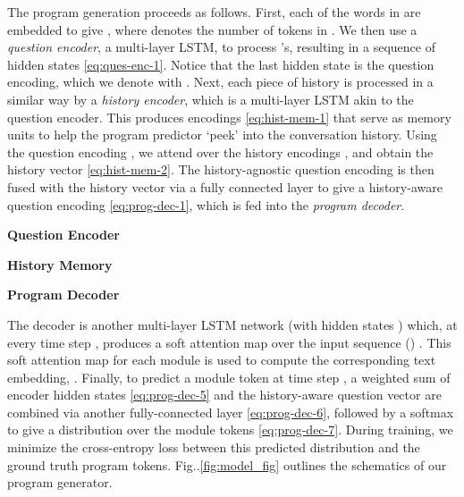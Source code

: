 \documentclass[runningheads]{llncs}
\makeatletter
\DeclareRobustCommand\onedot{\futurelet\@let@token\@onedot}
\def\@onedot{\ifx\@let@token.\else.\null\fi\xspace}
\def\Fig{Fig\onedot}
\makeatother
\begin{document}
The program generation proceeds as follows.
First, each of the words in  are embedded to give ,
where  denotes the number of tokens in .
We then use a \textit{question encoder}, a multi-layer LSTM, to process
's, resulting in a sequence of hidden states 
\eqref{eq:ques-enc-1}.
Notice that the last hidden state  is the question encoding, which we
denote with .
Next, each piece of history  is processed in a similar
way by a \textit{history encoder}, which is a multi-layer LSTM akin to the
question encoder.
This produces encodings  \eqref{eq:hist-mem-1} that serve 
as memory units to help the program predictor `peek' into the conversation
history.
Using the question encoding , we attend over the history encodings 
, and obtain the history vector  
\eqref{eq:hist-mem-2}.
The history-agnostic question encoding  is then fused with the history 
vector  via a fully connected layer to give a history-aware
question encoding  \eqref{eq:prog-dec-1}, which is fed into the \textit{program decoder}.

\small
\begin{multicols}{2}
\begin{center}\textbf{Question Encoder}\end{center}
\vspace*{-10pt}


\begin{center}\textbf{History Memory}\end{center}
\vspace*{-10pt}
 
\vspace*{-20pt}
\columnbreak
\vspace*{-20pt}
\begin{center}\textbf{Program Decoder}\end{center}
\vspace*{-30pt}
 
\end{multicols}
\normalsize 
The decoder is another multi-layer LSTM network (with hidden states 
) which, at every time step ,
produces a soft attention map  over the input sequence () 
\cite{bahdanau_iclr15}.
This soft attention map for each module is used to compute the corresponding
text embedding, .
Finally, to predict a module token  at time step , a weighted sum
of encoder hidden states  \eqref{eq:prog-dec-5} and the history-aware 
question vector  are combined via another fully-connected
layer \eqref{eq:prog-dec-6}, followed by a softmax to give a distribution 
 over the module tokens 
\eqref{eq:prog-dec-7}.
During training, we minimize the cross-entropy loss 
 between this predicted distribution and the ground truth 
program tokens.
\Fig\ref{fig:model_fig} outlines the schematics of our program generator.
\end{document}
